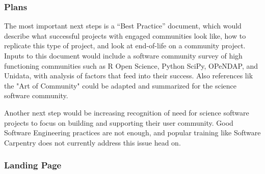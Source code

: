 \subsubsection{Plans}

The most important next steps is a ``Best Practice'' document, which would describe what successful projects with engaged communities look like, how to replicate this type of project, and look at end-of-life on a community project. Inputs to this document would include a software community survey of high functioning communities such as R Open Science, Python SciPy, OPeNDAP, and Unidata, with analysis of factors that feed into their success. Also references lik the "Art of Community" could be adapted and summarized for the science software community.

Another next step would be increasing recognition of need for science software projects to focus on building and supporting their user community. Good Software Engineering practices are not enough, and popular training like Software Carpentry does not currently address this issue head on.

\subsubsection{Landing Page}
